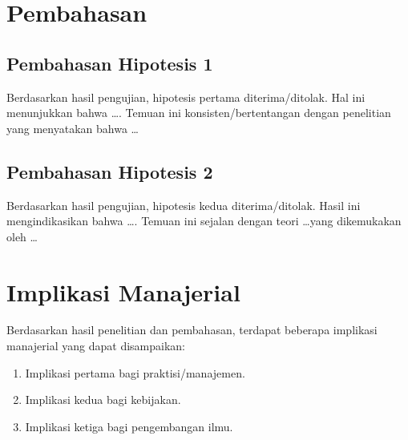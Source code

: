 \section{Pembahasan}
\label{sec:pembahasan}

\subsection{Pembahasan Hipotesis 1}
\label{subsec:pembahasan-h1}

Berdasarkan hasil pengujian, hipotesis pertama diterima/ditolak. Hal ini menunjukkan
bahwa \ldots. Temuan ini konsisten/bertentangan dengan penelitian \parencite{contohSumber2025}
yang menyatakan bahwa \ldots

\subsection{Pembahasan Hipotesis 2}
\label{subsec:pembahasan-h2}

Berdasarkan hasil pengujian, hipotesis kedua diterima/ditolak. Hasil ini mengindikasikan
bahwa \ldots. Temuan ini sejalan dengan teori \ldots yang dikemukakan oleh \ldots

\section{Implikasi Manajerial}
\label{sec:implikasi}

Berdasarkan hasil penelitian dan pembahasan, terdapat beberapa implikasi manajerial
yang dapat disampaikan:

\begin{enumerate}
  \item Implikasi pertama bagi praktisi/manajemen.
  \item Implikasi kedua bagi kebijakan.
  \item Implikasi ketiga bagi pengembangan ilmu.
\end{enumerate}
